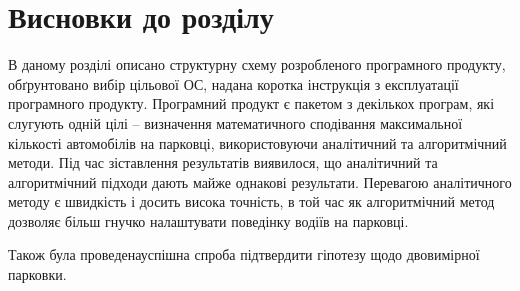 \section{Висновки до розділу}

В даному розділі описано структурну схему розробленого програмного продукту, обґрунтовано вибір цільової ОС, надана коротка інструкція з експлуатації програмного продукту. Програмний продукт є пакетом з декількох програм, які слугують одній цілі – визначення математичного сподівання максимальної кількості автомобілів на парковці, використовуючи аналітичний та алгоритмічний методи. Під час зіставлення результатів виявилося, що аналітичний та алгоритмічний підходи дають майже однакові результати. Перевагою аналітичного методу є швидкість і досить висока точність, в той час як алгоритмічний метод дозволяє більш гнучко налаштувати поведінку водіїв на парковці.

Також була проведенауспішна спроба підтвердити гіпотезу щодо двовимірної парковки.